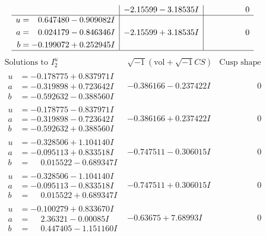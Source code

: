 \documentclass[1p]{elsarticle_modified}
\theoremstyle{definition}
\newcommand{\I}{\sqrt{-1}}
\begin{document}
$$\begin{array}{c|c|c}
 & -2.15599 - 3.18535 I & \phantom{-0.000000 } 0 \\ \hline\begin{aligned}
u &= \phantom{-}0.647480 - 0.909082 I \\
a &= \phantom{-}0.024179 - 0.846346 I \\
b &= -0.199072 + 0.252945 I\end{aligned}
 & -2.15599 + 3.18535 I & \phantom{-0.000000 } 0\\
 \hline 
 \end{array}$$\newpage$$\begin{array}{c|c|c}  
\text{Solutions to }I^u_{2}& \I (\text{vol} + \sqrt{-1}CS) & \text{Cusp shape}\\
 \hline 
\begin{aligned}
u &= -0.178775 + 0.837971 I \\
a &= -0.319898 + 0.723642 I \\
b &= -0.592632 - 0.388560 I\end{aligned}
 & -0.386166 - 0.237422 I & \phantom{-0.000000 } 0 \\ \hline\begin{aligned}
u &= -0.178775 - 0.837971 I \\
a &= -0.319898 - 0.723642 I \\
b &= -0.592632 + 0.388560 I\end{aligned}
 & -0.386166 + 0.237422 I & \phantom{-0.000000 } 0 \\ \hline\begin{aligned}
u &= -0.328506 + 1.104140 I \\
a &= -0.095113 + 0.833518 I \\
b &= \phantom{-}0.015522 - 0.689347 I\end{aligned}
 & -0.747511 - 0.306015 I & \phantom{-0.000000 } 0 \\ \hline\begin{aligned}
u &= -0.328506 - 1.104140 I \\
a &= -0.095113 - 0.833518 I \\
b &= \phantom{-}0.015522 + 0.689347 I\end{aligned}
 & -0.747511 + 0.306015 I & \phantom{-0.000000 } 0 \\ \hline\begin{aligned}
u &= -0.100279 + 0.833670 I \\
a &= \phantom{-}2.36321 - 0.00085 I \\
b &= \phantom{-}0.447405 - 1.151160 I\end{aligned}
 & -0.63675 + 7.68993 I & \phantom{-0.000000 } 0 \\ \hline\begin{aligned}

\end{aligned}
\end{array}$$
\end{document}
